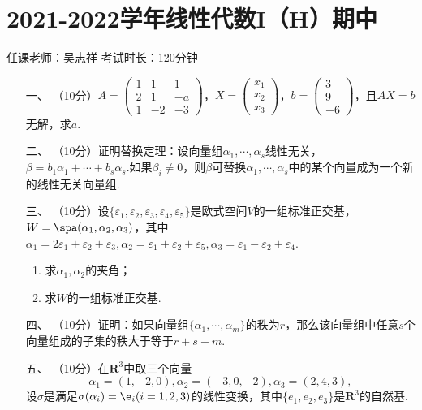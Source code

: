 \section*{2021-2022学年线性代数I（H）期中}

\begin{center}
    任课老师：吴志祥\hspace{4em} 考试时长：120分钟
\end{center}
\begin{enumerate}
	\item[一、]（10分）$A=\begin{pmatrix}
        1 & 1 & 1 \\ 2 & 1 & -a \\ 1 & -2 & -3
    \end{pmatrix}$，$X=\begin{pmatrix}
        x_1 \\ x_2 \\ x_3
    \end{pmatrix}$，$b=\begin{pmatrix}
        3 \\ 9 \\ -6
    \end{pmatrix}$，且$AX=b$无解，求$a$.
	\item[二、]（10分）证明替换定理：设向量组$\alpha_1,\cdots,\alpha_s$线性无关，$\beta=b_1\alpha_1+\cdots+b_s\alpha_s$.如果$\beta_i\neq 0$，则$\beta$可替换$\alpha_1,\cdots,\alpha_s$中的某个向量成为一个新的线性无关向量组.
	\item[三、]（10分）设$\{\varepsilon_1,\varepsilon_2,\varepsilon_3,\varepsilon_4,\varepsilon_5\}$是欧式空间$V$的一组标准正交基，$W=\spa(\alpha_1,\alpha_2,\alpha_3)$，其中$\alpha_1=2\varepsilon_1+\varepsilon_2+\varepsilon_3,\alpha_2=\varepsilon_1+\varepsilon_2+\varepsilon_5,\alpha_3=\varepsilon_1-\varepsilon_2+\varepsilon_4$.
	\begin{enumerate}[label=(\arabic*)]
        \item 求$\alpha_1,\alpha_2$的夹角；
        \item 求$W$的一组标准正交基.
    \end{enumerate}
	\item[四、]（10分）证明：如果向量组$\{\alpha_1,\cdots,\alpha_m\}$的秩为$r$，那么该向量组中任意$s$个向量组成的子集的秩大于等于$r+s-m$.
	\item[五、]（10分）在$\mathbf{R}^3$中取三个向量
	\[\alpha_1=(1,-2,0),\alpha_2=(-3,0,-2),\alpha_3=(2,4,3),\]
    设$\sigma$是满足$\sigma(\alpha_i)=\e_i(i=1,2,3)$的线性变换，其中$\{e_1,e_2,e_3\}$是$\mathbf{R}^3$的自然基.

\end{enumerate}
